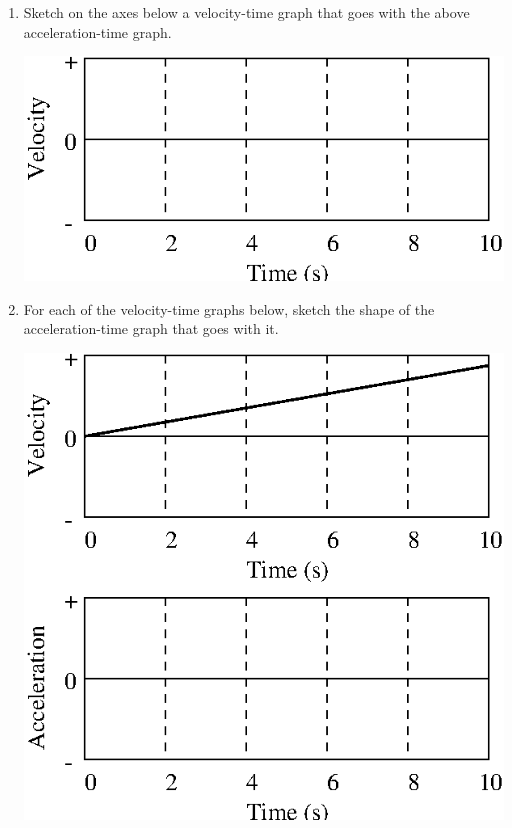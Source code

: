 \begin{enumerate}
\item Sketch on the axes below a velocity-time graph that goes with the above acceleration-time
graph.

\vspace{0.3cm}
{\par\centering \includegraphics{iqsRelatingMotion/changing_fig7.eps} \par}
\vspace{1.3cm}

\item For each of the velocity-time graphs below, sketch the shape of the acceleration-time
graph that goes with it.

\vspace{0.3cm}
{\par\centering \includegraphics{iqsRelatingMotion/changing_fig8.eps} \par}
\vspace{0.3cm}


\end{enumerate}
